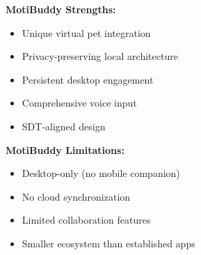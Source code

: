 \textbf{MotiBuddy Strengths:}
\begin{itemize}
    \item Unique virtual pet integration
    \item Privacy-preserving local architecture
    \item Persistent desktop engagement
    \item Comprehensive voice input
    \item SDT-aligned design
\end{itemize}

\textbf{MotiBuddy Limitations:}
\begin{itemize}
    \item Desktop-only (no mobile companion)
    \item No cloud synchronization
    \item Limited collaboration features
    \item Smaller ecosystem than established apps
\end{itemize}

